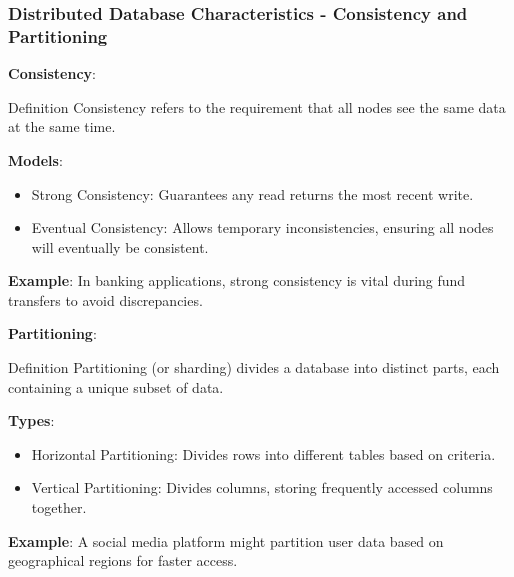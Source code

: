 \documentclass[aspectratio=169]{beamer}
\begin{document}
\begin{frame}[fragile]
  \frametitle{Distributed Database Characteristics - Consistency and Partitioning}
  \textbf{Consistency}:
  \begin{block}{Definition}
    Consistency refers to the requirement that all nodes see the same data at the same time.
  \end{block}

  \textbf{Models}:
  \begin{itemize}
    \item Strong Consistency: Guarantees any read returns the most recent write.
    \item Eventual Consistency: Allows temporary inconsistencies, ensuring all nodes will eventually be consistent.
  \end{itemize}

  \textbf{Example}: 
  In banking applications, strong consistency is vital during fund transfers to avoid discrepancies.

  \vspace{1em} %
  \textbf{Partitioning}:
  \begin{block}{Definition}
    Partitioning (or sharding) divides a database into distinct parts, each containing a unique subset of data.
  \end{block}

  \textbf{Types}:
  \begin{itemize}
    \item Horizontal Partitioning: Divides rows into different tables based on criteria.
    \item Vertical Partitioning: Divides columns, storing frequently accessed columns together.
  \end{itemize}

  \textbf{Example}: A social media platform might partition user data based on geographical regions for faster access.
\end{frame}
\end{document}
